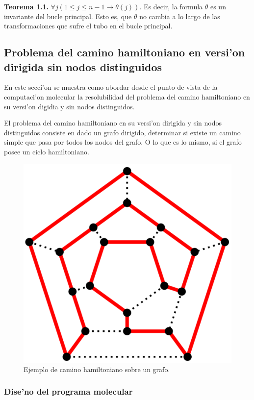 \documentclass[12pt]{article}
\begin{document}
\textbf{Teorema 1.1.} $\forall j (1 \leq j \leq n-1 \to \theta(j))$. Es decir, la formula $\theta$ es un invariante del
bucle principal. Esto es, que $\theta$ no cambia a lo largo de las transformaciones que sufre el tubo en el bucle principal.

\subsection{Problema del camino hamiltoniano en versi'on dirigida sin nodos distinguidos}

En este secci'on se muestra como abordar desde el punto de vista de la computaci'on molecular la resolubilidad
del problema del camino hamiltoniano en su versi'on digidia y sin nodos distinguidos.

El problema del camino hamiltoniano en su versi'on dirigida y sin nodos distinguidos consiste en
dado un grafo dirigido, determinar si existe un camino simple que pasa por todos los nodos del grafo. O lo
que es lo mismo, si el grafo posee un ciclo hamiltoniano.

\begin{figure}[h]
\centering
\includegraphics[scale=0.5]{hamiltoniano}
\caption{Ejemplo de camino hamiltoniano sobre un grafo.}
\end{figure}

\subsubsection{Dise'no del programa molecular}
\end{document}
